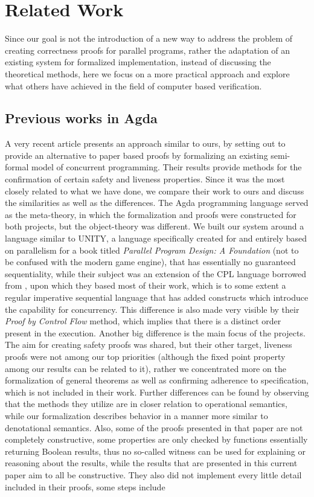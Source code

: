 \chapter{Related Work}
\label{sec:related}

Since our goal is not the introduction of a new way to address the problem of creating correctness proofs for parallel programs, rather the adaptation of an existing system for formalized implementation, instead of discussing the theoretical methods, here we focus on a more practical approach and explore what others have achieved in the field of computer based verification.

\section{Previous works in Agda}
A very recent article \cite{Bergsten2017MethodsFU} presents an approach similar to ours, by setting out to provide an alternative to paper based proofs by formalizing an existing semi-formal model of concurrent programming. Their results provide methods for the confirmation of certain safety and liveness properties. Since it was the most closely related to what we have done, we compare their work to ours and discuss the similarities as well as the differences. The Agda programming language served as the meta-theory, in which the formalization and proofs were constructed for both projects, but the object-theory was different. We built our system around a language similar to UNITY, a language specifically created for and entirely based on parallelism for a book titled \textit{Parallel Program Design: A Foundation}\cite{misra1989foundation} (not to be confused with the modern game engine), that has essentially no guaranteed sequentiality, while their subject was an extension of the CPL language borrowed from \cite{owicki1982proving}, upon which they based most of their work, which is to some extent a regular imperative sequential language that has added constructs which introduce the capability for concurrency. This difference is also made very visible by their \textit{Proof by Control Flow} method, which implies that there is a distinct order present in the execution. Another big difference is the main focus of the projects. The aim for creating safety proofs was shared, but their other target, liveness proofs were not among our top priorities (although the fixed point property among our results can be related to it), rather we concentrated more on the formalization of general theorems as well as confirming adherence to specification, which is not included in their work. Further differences can be found by observing that the methods they utilize are in closer relation to operational semantics, while our formalization describes behavior in a manner more similar to denotational semantics. Also, some of the proofs presented in that paper are not completely constructive, some properties are only checked by functions essentially returning Boolean results, thus no so-called witness can be used for explaining or reasoning about the results, while the results that are presented in this current paper aim to all be constructive. They also did not implement every little detail included in their proofs, some steps include 